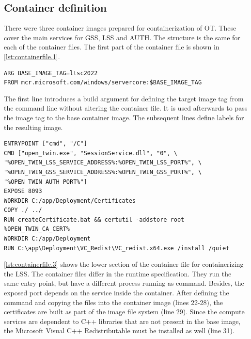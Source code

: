 \subsection{Container definition}
There were three container images prepared for containerization of \ac{OT}. These cover the main services for \ac{GSS}, \ac{LSS} and \ac{AUTH}. The structure is the same for each of the container files. The first part of the container file is shown in \autoref{lst:containerfile.1}.
\begin{lstlisting}[label=lst:containerfile.1, caption={Containerfile for the \ac{LSS}. Description of the base image and variable tagging using a build argument. (\textit{Distribution/Container/session.Containerfile})}, language=docker, firstnumber=1]
ARG BASE_IMAGE_TAG=ltsc2022
FROM mcr.microsoft.com/windows/servercore:$BASE_IMAGE_TAG
\end{lstlisting}
The first line introduces a build argument for defining the target image tag from the command line without altering the container file.  It is used afterwards to pass the image tag to the base container image. The subsequent lines define labels for the resulting image.
\vspace{1em}
\begin{lstlisting}[label=lst:containerfile.3, caption={Containerfile for the \ac{GSS}. Description of the command line and certificate creation. (\textit{Distribution/Container/session.Containerfile})}, language=docker, firstnumber=21]
ENTRYPOINT ["cmd", "/C"]
CMD ["open_twin.exe", "SessionService.dll", "0", \
"%OPEN_TWIN_LSS_SERVICE_ADDRESS%:%OPEN_TWIN_LSS_PORT%", \
"%OPEN_TWIN_GSS_SERVICE_ADDRESS%:%OPEN_TWIN_GSS_PORT%", \
"%OPEN_TWIN_AUTH_PORT%"]
EXPOSE 8093
WORKDIR C:/app/Deployment/Certificates
COPY ./ ../
RUN createCertificate.bat && certutil -addstore root %OPEN_TWIN_CA_CERT%
WORKDIR C:/app/Deployment
RUN C:\app\Deployment\VC_Redist\VC_redist.x64.exe /install /quiet
\end{lstlisting}
\autoref{lst:containerfile.3} shows the lower section of the container file for containerizing the \ac{LSS}.
The container files differ in the runtime specification. They run the same entry point, but have a different process running as command. Besides, the exposed port depends on the service inside the container. 
After defining the command and copying the files into the container image (lines 22-28), the certificates are built as part of the image file system (line 29). Since the compute services are dependent to C++ libraries that are not present in the base image, the Microsoft Visual C++ Redistributable must be installed as well (line 31).

